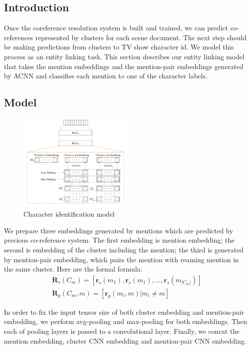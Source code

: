 \documentclass[11pt]{article}
\begin{document}
\subsection{Introduction}
Once the coreference resolution system is built and trained, we can predict co-references represented by clusters for each scene document. The next step should be making predictions from clusters to TV show character id. We model this process as an entity linking task. This section describes our entity linking model that takes the mention embeddings and the mention-pair embeddings generated by ACNN and classifies each mention to one of the character labels.

\subsection{Model}
\begin{figure}[h]                
 \includegraphics[width=0.5\textwidth]{05.jpg}
 \caption{Character identification model}             
\end{figure}

We prepare three embeddings generated by mentions which are predicted by precious co-reference system. The first embedding is mention embedding; the second is embedding of the cluster including the mention; the third is generated by mention-pair embedding, which pairs the mention with reaming mention in the same cluster. Here are the formal formula:
\begin{eqnarray}
\mathbf{R}_s(C_m) = [\mathbf{r}_s(m_1),\mathbf{r}_s(m_1),...,\mathbf{r}_s(m_{|C_m|})]\\
\mathbf{R}_p(C_m,m) = [\mathbf{r}_p(m_i,m)|m_i \neq m]
\end{eqnarray}



In order to fix the input tensor size of both cluster embedding and mention-pair embedding, we perform avg-pooling and max-pooling for both embeddings. Then each of pooling layers is passed to a convolutional layer. Finally, we concat the mention embedding, cluster CNN embedding and mention-pair CNN embedding.
\end{document}
